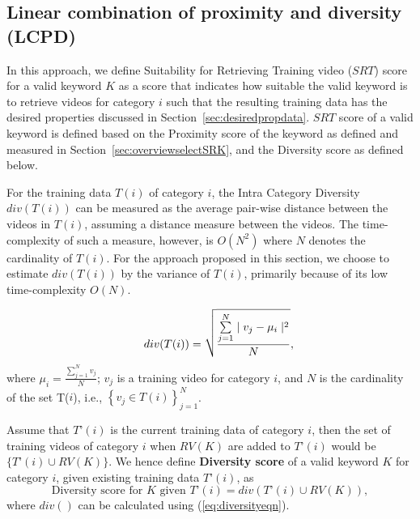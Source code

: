 \subsection{Linear combination of proximity and diversity (LCPD) }
\label{sec:lcpd}

In this approach, we define Suitability for Retrieving Training video ($SRT$) score for a valid keyword $K$ as a score that indicates how suitable the valid keyword is to retrieve videos for category $i$ such that the resulting training data has the desired properties discussed in Section~\ref{sec:desiredpropdata}. $SRT$ score of a valid keyword is defined based on the Proximity score of the keyword as defined and measured in Section~\ref{sec:overviewselectSRK}, and the Diversity score as defined below. 

For the training data $T(i)$ of category $i$, the Intra Category Diversity $div(T(i))$ can be measured as the average pair-wise distance between the videos in $T(i)$, assuming a distance measure between the videos. The time-complexity of such a measure, however, is $O(N^2)$ where $N$ denotes the cardinality of $T(i)$. For the approach proposed in this section, we choose to estimate $div(T(i))$ by the variance of $T(i)$, primarily because of its low time-complexity $O(N)$. 

\begin{equation} \label{eq:diversityeqn}
\indent div(T(i)) =   \sqrt{\frac{\sum\limits_{j=1}^N \mid v_j - \mu_i \mid ^2}{N}}  , 
\end{equation}
where $\mu_i=\frac{\sum\limits_{j=1}^{N} v_j}{N}$; $v_j$ is a training video for category $i$, and $N$ is the cardinality of the set T($i$), i.e., $\left \{ v_j \in T(i) \right \}_{j=1}^{N}$.

Assume that $T\text{'}(i)$ is the current training data of category $i$, then the set of training videos of category $i$ when $RV(K)$ are added to $T\text{'}(i)$ would be  $\{T\text{'}(i) \cup RV(K)\}$. We hence define \textbf{Diversity score} of a valid keyword $K$ for category $i$, given existing training data $T\text{'}(i)$, as 
\begin{equation} \label{eq:divscorelcpd}
\text{Diversity score for $K$ given $T\text{'}(i)$} = div(T\text{'}(i) \cup RV(K)),
\end{equation}
where $div()$ can be calculated using (\ref{eq:diversityeqn}). 

